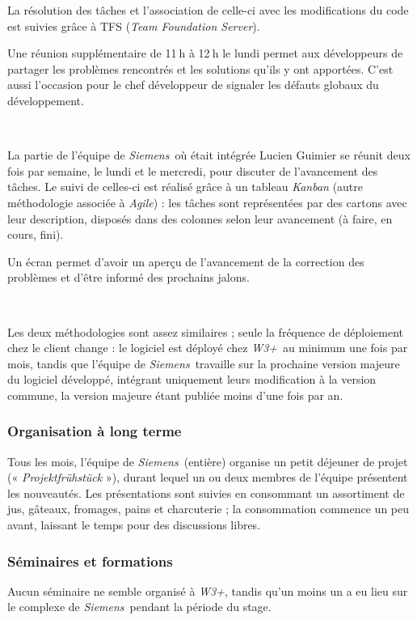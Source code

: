 \documentclass[a4paper, oneside, 12pt]{article}
\def\www{\emph{W3+}}
\def\siemens{\emph{Siemens}}
\begin{document}
La résolution des tâches et l’association de celle-ci avec les modifications du code est suivies grâce à TFS (\emph{Team Foundation Server}).

Une réunion supplémentaire de 11$~$h à 12$~$h le lundi permet aux développeurs de partager les problèmes rencontrés et les solutions qu’ils y ont apportées. C’est aussi l’occasion pour le chef développeur de signaler les défauts globaux du développement.

\ 

La partie de l’équipe de \siemens\ où était intégrée Lucien {\sc Guimier} se réunit deux fois par semaine, le lundi et le mercredi, pour discuter de l’avancement des tâches. Le suivi de celles-ci est réalisé grâce à un tableau \emph{Kanban} (autre méthodologie associée à \emph{Agile}) : les tâches sont représentées par des cartons avec leur description, disposés dans des colonnes selon leur avancement (à faire, en cours, fini).

Un écran permet d’avoir un aperçu de l’avancement de la correction des problèmes et d’être informé des prochains jalons.

\ 

Les deux méthodologies sont assez similaires ; seule la fréquence de déploiement chez le client change : le logiciel est déployé chez \www\ au minimum une fois par mois, tandis que l’équipe de \siemens\ travaille sur la prochaine version majeure du logiciel développé, intégrant uniquement leurs modification à la version commune, la version majeure étant publiée moins d’une fois par an.

\newpage

\subsubsection{Organisation à long terme}

Tous les mois, l’équipe de \siemens\ (entière) organise un petit déjeuner de projet (« \textit{Projektfrühstück} »), durant lequel un ou deux membres de l’équipe présentent les nouveautés. Les présentations sont suivies en consommant un assortiment de jus, gâteaux, fromages, pains et charcuterie ; la consommation commence un peu avant, laissant le temps pour des discussions libres.

\subsubsection{Séminaires et formations}

Aucun séminaire ne semble organisé à \www, tandis qu’un moins un a eu lieu sur le complexe de \siemens\ pendant la période du stage.
\end{document}
